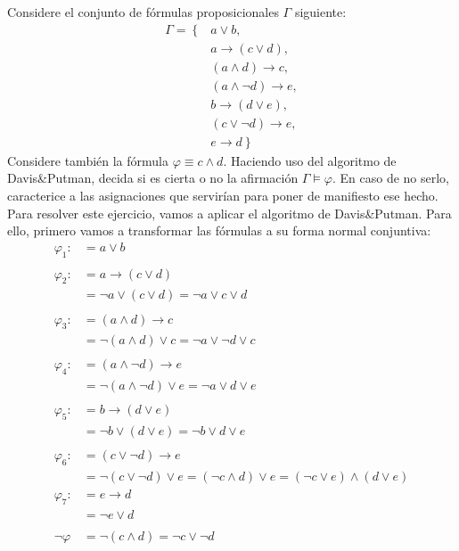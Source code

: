 \documentclass[12pt]{article}
\begin{document}
\begin{ejercicio} \label{ej:3}
    Considere el conjunto de fórmulas proposicionales $\Gamma$ siguiente:
    \begin{align*}
        \Gamma = \left\{ \right.&
            a\lor b, \\ &
            a\rightarrow (c\lor d), \\ &
            (a\land d) \rightarrow c, \\ &
            (a\land \lnot d) \rightarrow e, \\ &
            b\rightarrow (d\lor e), \\ &
            (c\lor \lnot d) \rightarrow e, \\ &
            e\rightarrow d \left.\right\}
    \end{align*}
    Considere también la fórmula $\varphi \equiv c\land d$. Haciendo uso del
    algoritmo de Davis\&Putman, decida si es cierta o no la afirmación $\Gamma \models \varphi$. En caso de
    no serlo, caracterice a las asignaciones que servirían para poner de manifiesto ese hecho.\\

    Para resolver este ejercicio, vamos a aplicar el algoritmo de Davis\&Putman. Para ello, primero
    vamos a transformar las fórmulas a su forma normal conjuntiva:
    \begin{align*}
        \varphi_1 :& = a\lor b\\ \\
        \varphi_2 :& = a\rightarrow (c\lor d)\\
        & = \lnot a \lor (c\lor d) = \lnot a \lor c \lor d\\ \\
        \varphi_3 :& = (a\land d) \rightarrow c\\
        & = \lnot (a\land d) \lor c = \lnot a \lor \lnot d \lor c\\ \\
        \varphi_4 :& = (a\land \lnot d) \rightarrow e\\
        & = \lnot (a\land \lnot d) \lor e = \lnot a \lor d \lor e\\ \\
        \varphi_5 :& = b\rightarrow (d\lor e)\\
        & = \lnot b \lor (d\lor e) = \lnot b \lor d \lor e\\ \\
        \varphi_6 :& = (c\lor \lnot d) \rightarrow e\\
        & = \lnot (c\lor \lnot d) \lor e = (\lnot c \land d) \lor e = (\lnot c \lor e) \land (d\lor e)\\
        \varphi_7 :& = e\rightarrow d\\
        & = \lnot e \lor d \\ \\
        \lnot \varphi & = \lnot (c\land d) = \lnot c \lor \lnot d
    \end{align*}


\end{ejercicio}
\end{document}
